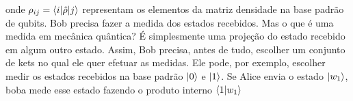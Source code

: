 \documentclass{article}
\begin{document}
onde $\rho_{ij} = \braket{i|\hat{\rho}|j}$ representam os elementos da matriz densidade na base padrão de qubits. Bob precisa fazer a medida dos estados recebidos. Mas o que é uma medida em mecânica quântica? É simplesmente uma projeção do estado recebido em algum outro estado. Assim, Bob precisa, antes de tudo, escolher um conjunto de kets no qual ele quer efetuar as medidas. Ele pode, por exemplo, escolher medir os estados recebidos na base padrão $\ket{0}$ e $\ket{1}$. Se Alice envia o estado $\ket{w_1}$, boba mede esse estado fazendo o produto interno $\braket{1|w_1}$
\end{document}
